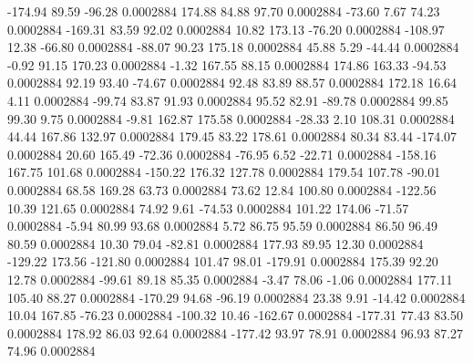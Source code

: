      -174.94       89.59      -96.28     0.0002884
      174.88       84.88       97.70     0.0002884
      -73.60        7.67       74.23     0.0002884
     -169.31       83.59       92.02     0.0002884
       10.82      173.13      -76.20     0.0002884
     -108.97       12.38      -66.80     0.0002884
      -88.07       90.23      175.18     0.0002884
       45.88        5.29      -44.44     0.0002884
       -0.92       91.15      170.23     0.0002884
       -1.32      167.55       88.15     0.0002884
      174.86      163.33      -94.53     0.0002884
       92.19       93.40      -74.67     0.0002884
       92.48       83.89       88.57     0.0002884
      172.18       16.64        4.11     0.0002884
      -99.74       83.87       91.93     0.0002884
       95.52       82.91      -89.78     0.0002884
       99.85       99.30        9.75     0.0002884
       -9.81      162.87      175.58     0.0002884
      -28.33        2.10      108.31     0.0002884
       44.44      167.86      132.97     0.0002884
      179.45       83.22      178.61     0.0002884
       80.34       83.44     -174.07     0.0002884
       20.60      165.49      -72.36     0.0002884
      -76.95        6.52      -22.71     0.0002884
     -158.16      167.75      101.68     0.0002884
     -150.22      176.32      127.78     0.0002884
      179.54      107.78      -90.01     0.0002884
       68.58      169.28       63.73     0.0002884
       73.62       12.84      100.80     0.0002884
     -122.56       10.39      121.65     0.0002884
       74.92        9.61      -74.53     0.0002884
      101.22      174.06      -71.57     0.0002884
       -5.94       80.99       93.68     0.0002884
        5.72       86.75       95.59     0.0002884
       86.50       96.49       80.59     0.0002884
       10.30       79.04      -82.81     0.0002884
      177.93       89.95       12.30     0.0002884
     -129.22      173.56     -121.80     0.0002884
      101.47       98.01     -179.91     0.0002884
      175.39       92.20       12.78     0.0002884
      -99.61       89.18       85.35     0.0002884
       -3.47       78.06       -1.06     0.0002884
      177.11      105.40       88.27     0.0002884
     -170.29       94.68      -96.19     0.0002884
       23.38        9.91      -14.42     0.0002884
       10.04      167.85      -76.23     0.0002884
     -100.32       10.46     -162.67     0.0002884
     -177.31       77.43       83.50     0.0002884
      178.92       86.03       92.64     0.0002884
     -177.42       93.97       78.91     0.0002884
       96.93       87.27       74.96     0.0002884
